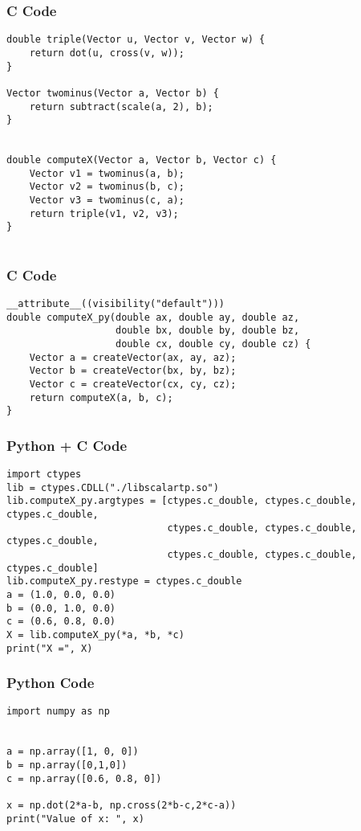 \documentclass{beamer}
\begin{document}
\begin{frame}[fragile]
    \frametitle{C Code}
    \begin{lstlisting}
double triple(Vector u, Vector v, Vector w) {
    return dot(u, cross(v, w));
}

Vector twominus(Vector a, Vector b) {
    return subtract(scale(a, 2), b); 
}


double computeX(Vector a, Vector b, Vector c) {
    Vector v1 = twominus(a, b);
    Vector v2 = twominus(b, c);
    Vector v3 = twominus(c, a);
    return triple(v1, v2, v3);
}


    \end{lstlisting}
\end{frame}

\begin{frame}[fragile]
    \frametitle{C Code}
    \begin{lstlisting}
__attribute__((visibility("default"))) 
double computeX_py(double ax, double ay, double az,
                   double bx, double by, double bz,
                   double cx, double cy, double cz) {
    Vector a = createVector(ax, ay, az);
    Vector b = createVector(bx, by, bz);
    Vector c = createVector(cx, cy, cz);
    return computeX(a, b, c);
}

    \end{lstlisting}
\end{frame}

\begin{frame}[fragile]
    \frametitle{Python + C Code}
    \begin{lstlisting}
import ctypes
lib = ctypes.CDLL("./libscalartp.so")
lib.computeX_py.argtypes = [ctypes.c_double, ctypes.c_double, ctypes.c_double,
                            ctypes.c_double, ctypes.c_double, ctypes.c_double,
                            ctypes.c_double, ctypes.c_double, ctypes.c_double]
lib.computeX_py.restype = ctypes.c_double
a = (1.0, 0.0, 0.0)
b = (0.0, 1.0, 0.0)
c = (0.6, 0.8, 0.0)
X = lib.computeX_py(*a, *b, *c)
print("X =", X)
    \end{lstlisting}
\end{frame}

\begin{frame}[fragile]
    \frametitle{Python Code}
    \begin{lstlisting}
import numpy as np


a = np.array([1, 0, 0])
b = np.array([0,1,0])
c = np.array([0.6, 0.8, 0])

x = np.dot(2*a-b, np.cross(2*b-c,2*c-a))
print("Value of x: ", x)


    \end{lstlisting}
\end{frame}
\end{document}
